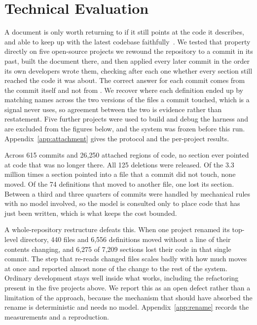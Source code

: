 \section{Technical Evaluation}

A document is only worth returning to if it still points at the code it describes, and able to keep up with the latest codebase faithfully~\cite{fluri2007code, wen2019large}. We tested that property directly on five open-source projects we rewound the repository to a commit in its past, built the document there, and then applied every later commit in the order its own developers wrote them, checking after each one whether every section still reached the code it was about. The correct answer for each commit comes from the commit itself and not from \sys{}. We recover where each definition ended up by matching names across the two versions of the files a commit touched, which is a signal \sys{} never uses, so agreement between the two is evidence rather than restatement. Five further projects were used to build and debug the harness and are excluded from the figures below, and the system was frozen before this run. Appendix~\ref{app:attachment} gives the protocol and the per-project results.

Across 615 commits and 26{,}250 attached regions of code, no section ever pointed at code that was no longer there. All 125 deletions were released. Of the 3.3 million times a section pointed into a file that a commit did not touch, none moved. Of the 74 definitions that moved to another file, one lost its section. Between a third and three quarters of commits were handled by mechanical rules with no model involved, so the model is consulted only to place code that has just been written, which is what keeps the cost bounded.

A whole-repository restructure defeats this. When one project renamed its top-level directory, 440 files and 6{,}556 definitions moved without a line of their contents changing, and 6{,}275 of 7{,}209 sections lost their code in that single commit. The step that re-reads changed files scales badly with how much moves at once and reported almost none of the change to the rest of the system. Ordinary development stays well inside what works, including the refactoring present in the five projects above. We report this as an open defect rather than a limitation of the approach, because the mechanism that should have absorbed the rename is deterministic and needs no model. Appendix~\ref{app:rename} records the measurements and a reproduction.

